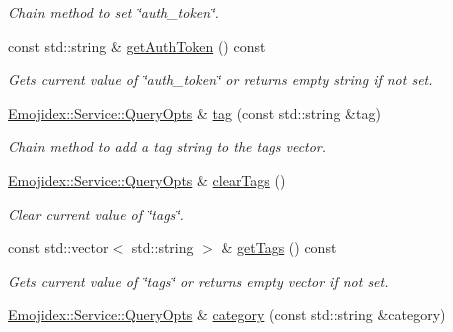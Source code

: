 \begin{DoxyCompactItemize}
\begin{DoxyCompactList}\small\item\em Chain method to set \char`\"{}auth\+\_\+token\char`\"{}. \end{DoxyCompactList}\item 
const std\+::string \& \hyperlink{classEmojidex_1_1Service_1_1QueryOpts_a26f673a87e58f3576e507321cb879eb8}{get\+Auth\+Token} () const 
\begin{DoxyCompactList}\small\item\em Gets current value of \char`\"{}auth\+\_\+token\char`\"{} or returns empty string if not set. \end{DoxyCompactList}\item 
\hyperlink{classEmojidex_1_1Service_1_1QueryOpts}{Emojidex\+::\+Service\+::\+Query\+Opts} \& \hyperlink{classEmojidex_1_1Service_1_1QueryOpts_ab0d2aa112c6ad9c9dadaec0e48b39f3d}{tag} (const std\+::string \&tag)\hypertarget{classEmojidex_1_1Service_1_1QueryOpts_ab0d2aa112c6ad9c9dadaec0e48b39f3d}{}\label{classEmojidex_1_1Service_1_1QueryOpts_ab0d2aa112c6ad9c9dadaec0e48b39f3d}

\begin{DoxyCompactList}\small\item\em Chain method to add a tag string to the tags vector. \end{DoxyCompactList}\item 
\hyperlink{classEmojidex_1_1Service_1_1QueryOpts}{Emojidex\+::\+Service\+::\+Query\+Opts} \& \hyperlink{classEmojidex_1_1Service_1_1QueryOpts_a04cb66831c992b892b1ca80228bcffae}{clear\+Tags} ()\hypertarget{classEmojidex_1_1Service_1_1QueryOpts_a04cb66831c992b892b1ca80228bcffae}{}\label{classEmojidex_1_1Service_1_1QueryOpts_a04cb66831c992b892b1ca80228bcffae}

\begin{DoxyCompactList}\small\item\em Clear current value of \char`\"{}tags\char`\"{}. \end{DoxyCompactList}\item 
const std\+::vector$<$ std\+::string $>$ \& \hyperlink{classEmojidex_1_1Service_1_1QueryOpts_a0085f26b918a3466ea8524e754f30598}{get\+Tags} () const 
\begin{DoxyCompactList}\small\item\em Gets current value of \char`\"{}tags\char`\"{} or returns empty vector if not set. \end{DoxyCompactList}\item 
\hyperlink{classEmojidex_1_1Service_1_1QueryOpts}{Emojidex\+::\+Service\+::\+Query\+Opts} \& \hyperlink{classEmojidex_1_1Service_1_1QueryOpts_a55bf6248156ed527d0cb1a469488c999}{category} (const std\+::string \&category)\hypertarget{classEmojidex_1_1Service_1_1QueryOpts_a55bf6248156ed527d0cb1a469488c999}{}\label{classEmojidex_1_1Service_1_1QueryOpts_a55bf6248156ed527d0cb1a469488c999}


\end{DoxyCompactItemize}
